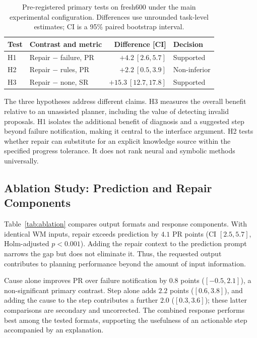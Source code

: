 \documentclass[runningheads]{llncs}
\begin{document}
\begin{table}[tbp]
\caption{Pre-registered primary tests on fresh600 under the main experimental configuration. Differences use unrounded task-level estimates; CI is a 95\% paired bootstrap interval.}
\label{tab:hypotheses}\centering
\begin{tabular}{llrl}\toprule
Test & Contrast and metric & Difference [CI] & Decision\\\midrule
H1 & Repair $-$ failure, PR & $+4.2\ [2.6,5.7]$ & Supported\\
H2 & Repair $-$ rules, PR & $+2.2\ [0.5,3.9]$ & Non-inferior\\
H3 & Repair $-$ none, SR & $+15.3\ [12.7,17.8]$ & Supported\\\bottomrule
\end{tabular}
\end{table}

The three hypotheses address different claims. H3 measures the overall benefit relative to an unassisted planner, including the value of detecting invalid proposals. H1 isolates the additional benefit of diagnosis and a suggested step beyond failure notification, making it central to the interface argument. H2 tests whether repair can substitute for an explicit knowledge source within the specified progress tolerance. It does not rank neural and symbolic methods universally.

\subsection{Ablation Study: Prediction and Repair Components}
Table~\ref{tab:ablation} compares output formats and response components. With identical WM inputs, repair exceeds prediction by $4.1$ PR points (CI $[2.5,5.7]$, Holm-adjusted $p<0.001$). Adding the repair context to the prediction prompt narrows the gap but does not eliminate it. Thus, the requested output contributes to planning performance beyond the amount of input information.

Cause alone improves PR over failure notification by $0.8$ points ($[-0.5,2.1]$), a non-significant primary contrast. Step alone adds $2.2$ points ($[0.6,3.8]$), and adding the cause to the step contributes a further $2.0$ ($[0.3,3.6]$); these latter comparisons are secondary and uncorrected. The combined response performs best among the tested formats, supporting the usefulness of an actionable step accompanied by an explanation.
\end{document}
